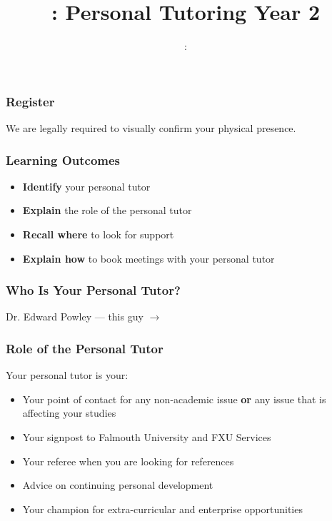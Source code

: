 \usepackage[T1]{fontenc}
\usepackage{../../beamerthemeFalmouthGamesAcademy}
\usepackage{multimedia}
\graphicspath{ {../../} }


\usepackage[normalem]{ulem}
\usepackage{wasysym}

\usepackage{pdfpages}

\usetikzlibrary{arrows,automata}




\title{\sessionnumber: Personal Tutoring Year 2}
\subtitle{\modulecode: \moduletitle}

\frame{\titlepage} 

\begin{frame}
	\frametitle{Register}
	
	We are legally required to visually confirm your physical presence.
	
\end{frame}

\begin{frame}
	\frametitle{Learning Outcomes}
	\begin{itemize}
		\item \textbf{Identify} your personal tutor
		\item \textbf{Explain} the role of the personal tutor
		\item \textbf{Recall where} to look for support
		\item \textbf{Explain how} to book meetings with your personal tutor
	\end{itemize}
\end{frame}

\begin{frame}
	\frametitle{Who Is Your Personal Tutor?}
	\begin{center}
		Dr. Edward Powley --- this guy $\longrightarrow$
	\end{center}
\end{frame}

\begin{frame}
	\frametitle{Role of the Personal Tutor}	
	
	Your personal tutor is your:
	
	\begin{itemize}
		\item Your point of contact for any non-academic issue \textbf{or} any issue that is affecting your studies
		\item Your signpost to Falmouth University and FXU Services
		\item Your referee when you are looking for references
		\item Advice on continuing personal development
		\item Your champion for extra-curricular and enterprise opportunities 
	\end{itemize}
\end{frame}

